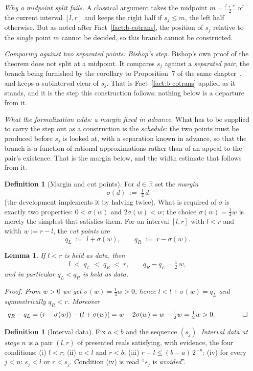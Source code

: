 \documentclass[11pt]{article}
\newtheorem{lemma}[theorem]{Lemma}
\theoremstyle{definition}
\newtheorem{definition}[theorem]{Definition}
\theoremstyle{remark}
\begin{document}
\emph{Why a midpoint split fails.}  A classical argument takes the midpoint $m=\tfrac{l+r}{2}$ of the current interval $[l,r]$ and keeps the right half if $s_j\le m$, the left half otherwise.  But as noted after Fact~\ref{fact:b-cotrans}, the position of $s_j$ relative to the \emph{single} point $m$ cannot be decided, so this branch cannot be constructed.

\emph{Comparing against two separated points: Bishop's step.}  Bishop's own proof of the theorem does not split at a midpoint.  It compares $s_j$ against a \emph{separated pair}, the branch being furnished by the corollary to Proposition~7 of the same chapter~\cite[Ch.~2]{bishop-1967}, and keeps a subinterval clear of $s_j$.  That is Fact~\ref{fact:b-cotrans} applied as it stands, and it is the step this construction follows; nothing below is a departure from it.

\emph{What the formalization adds: a margin fixed in advance.}  What has to be supplied to carry the step out as a construction is the \emph{schedule}: the two points must be produced before $s_j$ is looked at, with a separation known in advance, so that the branch is a function of rational approximations rather than of an appeal to the pair's existence.  That is the margin below, and the width estimate that follows from it.

\begin{definition}[Margin and cut points]
\label{def:b-margin}
For $d\in\mathbb{R}$ set the \emph{margin}
\[
\sigma(d)\;:=\;\tfrac14\,d
\]
(the development implements it by halving twice).  What is required of $\sigma$ is exactly two properties: $0<\sigma(w)$ and $2\sigma(w)<w$; the choice $\sigma(w)=\tfrac14 w$ is merely the simplest that satisfies them.  For an interval $[l,r]$ with $l<r$ and width $w:=r-l$, the \emph{cut points} are
\[
q_L\;:=\;l+\sigma(w),\qquad q_R\;:=\;r-\sigma(w).
\]
\end{definition}

\begin{lemma}
\label{lem:b-cutpoints}
If $l<r$ is held as data, then
\[
l\;<\;q_L\;<\;q_R\;<\;r,\qquad q_R-q_L=\tfrac12\,w ,
\]
and in particular $q_L<q_R$ is held as data.

\emph{Proof.}  From $w>0$ we get $\sigma(w)=\tfrac14w>0$, hence $l<l+\sigma(w)=q_L$ and symmetrically $q_R<r$.  Moreover
\[
q_R-q_L=(r-\sigma(w))-(l+\sigma(w))=w-2\sigma(w)=w-\tfrac12w=\tfrac12w>0 . \qquad\qed
\]
\end{lemma}

\begin{definition}[Interval data]
\label{def:b-intervaldata}
Fix $a<b$ and the sequence $(s_j)$.  \emph{Interval data at stage $n$} is a pair $(l,r)$ of presented reals satisfying, with evidence, the four conditions:
(i) $l<r$; (ii) $a<l$ and $r<b$; (iii) $r-l\le (b-a)\,2^{-n}$; (iv) for every $j<n$: $s_j<l$ or $r<s_j$.
Condition (iv) is read ``$s_j$ is \emph{avoided}''.
\end{definition}
\end{document}
